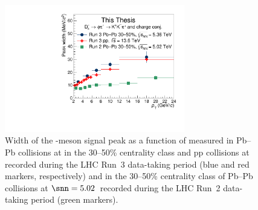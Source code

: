 \begin{figure}
    \centering
    \includegraphics[width=0.7\textwidth]{Figures/Chapter 8/Ds_widths_performance.pdf}
    \caption{Width of the \ds-meson signal peak as a function of \pt measured in Pb--Pb collisions at \fivenn in the 30--50\% centrality class and pp collisions at \thirteen recorded during the LHC Run~3 data-taking period  (blue and red markers, respectively) and in the 30--50\% centrality class of Pb--Pb collisions at $\snn=5.02$~\tev recorded during the LHC Run~2 data-taking period (green markers).}
    \label{fig:inv_mass_fit_res_pbpb}
\end{figure}
